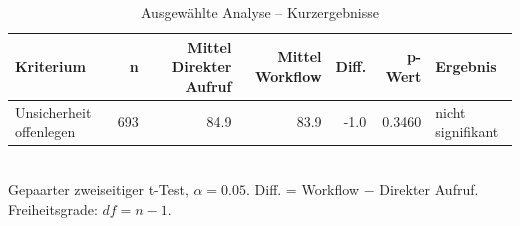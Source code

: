 \begin{table}[htbp]
\centering
\caption{Ausgewählte Analyse -- Kurzergebnisse}
\begin{tabular}{lrrrrrl}
\toprule
Kriterium & n & Mittel Direkter Aufruf & Mittel Workflow & Diff. & p-Wert & Ergebnis \\
\midrule
Unsicherheit offenlegen & 693 & 84.9 & 83.9 & -1.0 & 0.3460 & nicht signifikant \\
\bottomrule
\end{tabular}
\\[2mm]
\footnotesize Gepaarter zweiseitiger t-Test, $\alpha=0.05$. Diff. = Workflow $-$ Direkter Aufruf. Freiheitsgrade: $df=n-1$.
\end{table}
